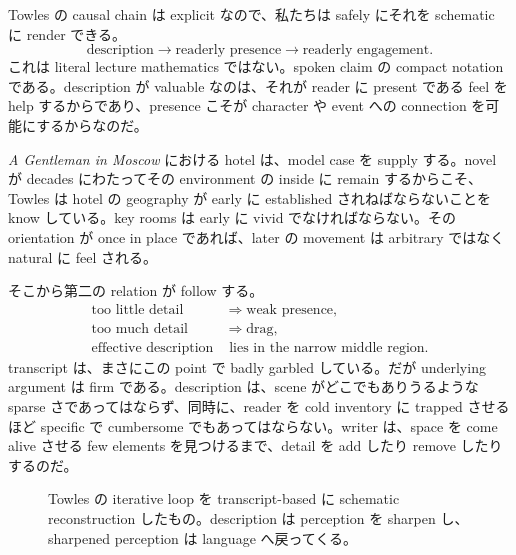 Towles の causal chain は explicit なので、私たちは safely にそれを schematic に render できる。
\begin{equation}
\text{description} \longrightarrow \text{readerly presence} \longrightarrow \text{readerly engagement}.
\end{equation}
これは literal lecture mathematics ではない。spoken claim の compact notation である。description が valuable なのは、それが reader に present である feel を help するからであり、presence こそが character や event への connection を可能にするからなのだ。

\emph{A Gentleman in Moscow} における hotel は、model case を supply する。novel が decades にわたってその environment の inside に remain するからこそ、Towles は hotel の geography が early に established されねばならないことを know している。key rooms は early に vivid でなければならない。その orientation が once in place であれば、later の movement は arbitrary ではなく natural に feel される。

そこから第二の relation が follow する。
\begin{align}
\text{too little detail} &\Rightarrow \text{weak presence}, \\
\text{too much detail} &\Rightarrow \text{drag}, \\
\text{effective description} &\text{ lies in the narrow middle region.}
\end{align}
transcript は、まさにこの point で badly garbled している。だが underlying argument は firm である。description は、scene がどこでもありうるような sparse さであってはならず、同時に、reader を cold inventory に trapped させるほど specific で cumbersome でもあってはならない。writer は、space を come alive させる few elements を見つけるまで、detail を add したり remove したりするのだ。

\begin{figure}[h]
\centering
{}
\caption{Towles の iterative loop を transcript-based に schematic reconstruction したもの。description は perception を sharpen し、sharpened perception は language へ戻ってくる。}
\end{figure}

